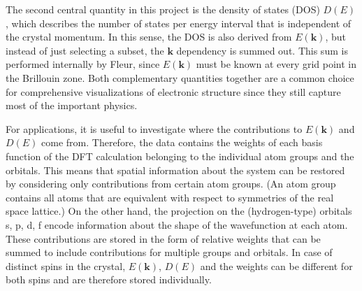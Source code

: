 The second central quantity in this project is the density of states (DOS)
$D(E)$, which describes the number of states per energy interval that is
independent of the crystal momentum. In this sense, the DOS is also derived from
$E(\mathbf{k})$, but instead of just selecting a subset, the $\mathbf{k}$
dependency is summed out. This sum is performed internally by Fleur, since
$E(\mathbf{k})$ must be known at every grid point in the Brillouin zone. Both complementary quantities together are a common choice for comprehensive visualizations of electronic structure since they still capture most of the important physics. 

For applications, it is useful to investigate where the contributions to $E(\mathbf{k})$ and $D(E)$ come from. Therefore, the data contains the weights of each basis function of the DFT calculation belonging to the individual atom groups and the orbitals. This means that spatial information about the system can be restored by considering only contributions from certain atom groups. (An atom group contains all atoms that are equivalent with respect to symmetries of the real space lattice.) On the other hand, the projection on the (hydrogen-type) orbitals s, p, d, f encode information about the shape of the wavefunction at each atom. These contributions are stored in the form of relative weights that can be summed to include contributions for multiple groups and orbitals. In case of distinct spins in the crystal, $E(\mathbf{k})$, $D(E)$ and the weights can be different for both spins and are therefore stored individually.



